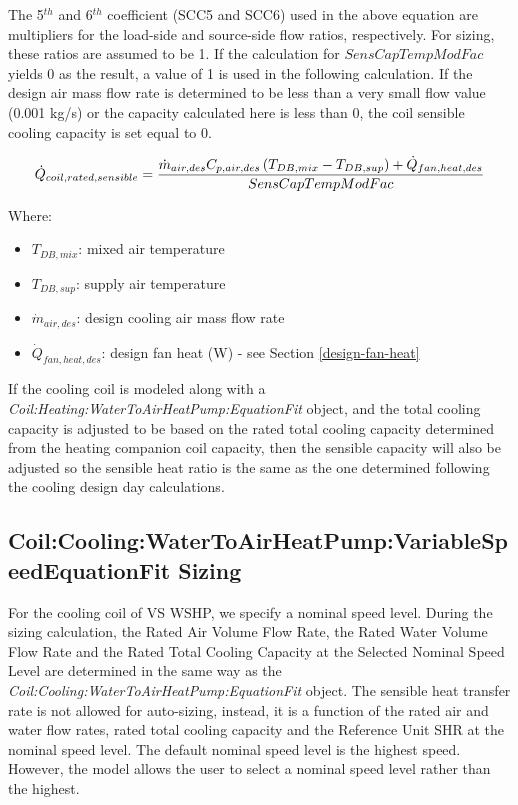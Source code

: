 The 5\(^{th}\) and 6\(^{th}\) coefficient (SCC5 and SCC6) used in the above equation are multipliers for the load-side and source-side flow ratios, respectively. For sizing, these ratios are assumed to be 1. If the calculation for $SensCapTempModFac$ yields 0 as the result, a value of 1 is used in the following calculation. If the design air mass flow rate is determined to be less than a very small flow value (0.001 kg/s) or the capacity calculated here is less than 0, the coil sensible cooling capacity is set equal to 0.

\begin{equation}
  \dot{Q}_{coil,rated,sensible} = \frac{\dot{m}_{air,des}C_{p,air,des}\left(T_{DB,mix}-T_{DB,sup}\right)+\dot{Q}_{fan,heat,des}}{SensCapTempModFac}
\end{equation}

Where:

\begin{itemize}
\item \(T_{DB,mix}\): mixed air temperature
\item \(T_{DB,sup}\): supply air temperature
\item \(\dot{m}_{air,des}\): design cooling air mass flow rate
\item \(\dot{Q}_{fan,heat,des}\): design fan heat (W) - see Section \ref{design-fan-heat}
\end{itemize}

If the cooling coil is modeled along with a \emph{Coil:Heating:WaterToAirHeatPump:EquationFit} object, and the total cooling capacity is adjusted to be based on the rated total cooling capacity determined from the heating companion coil capacity, then the sensible capacity will also be adjusted so the sensible heat ratio is the same as the one determined following the cooling design day calculations.

\subsection{Coil:Cooling:WaterToAirHeatPump:VariableSpeedEquationFit Sizing}\label{coilcoolingwatertoairheatpumpvariablespeedequationfit-sizing}

For the cooling coil of VS WSHP, we specify a nominal speed level. During the sizing calculation, the Rated Air Volume Flow Rate, the Rated Water Volume Flow Rate and the Rated Total Cooling Capacity at the Selected Nominal Speed Level are determined in the same way as the \emph{Coil:Cooling:WaterToAirHeatPump:EquationFit} object. The sensible heat transfer rate is not allowed for auto-sizing, instead, it is a function of the rated air and water flow rates, rated total cooling capacity and the Reference Unit SHR at the nominal speed level. The default nominal speed level is the highest speed. However, the model allows the user to select a nominal speed level rather than the highest.

